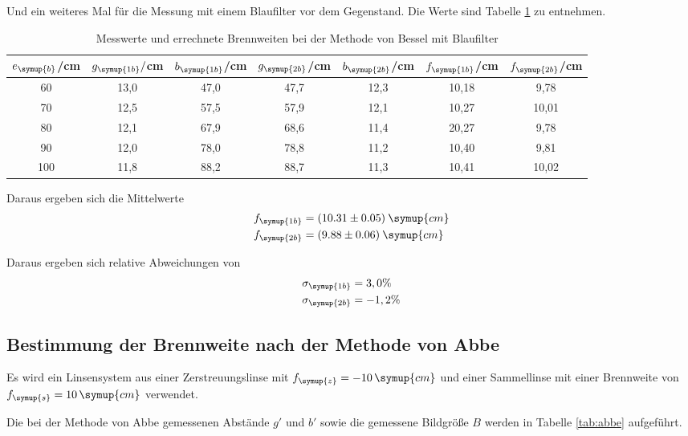 Und ein weiteres Mal für die Messung mit einem Blaufilter vor dem Gegenstand. Die Werte sind Tabelle
\ref{tab:besselblau} zu entnehmen.
\begin{table}[H]
  \centering
  \caption{Messwerte und errechnete Brennweiten bei der Methode von Bessel mit Blaufilter}
  \label{tab:besselblau}
  \begin{tabular}{c c c c c c c}
    \toprule
    $e_{\symup{b}}$/cm  & $g_{\symup{1b}}/$cm & $b_{\symup{1b}}$/cm & $g_{\symup{2b}}$/cm & $b_{\symup{2b}}$/cm & $f_{\symup{1b}}$/cm & $f_{\symup{2b}}$/cm \\
    \midrule
    60  &   13,0 &  47,0  &  47,7  &  12,3 & 10,18 & 9,78 \\
    70   &  12,5 &  57,5  &  57,9  &  12,1 & 10,27 & 10,01 \\
    80   &  12,1 &  67,9  &  68,6  &  11,4 & 20,27 & 9,78 \\
    90   &  12,0 &  78,0  &  78,8  &  11,2 & 10,40 & 9,81 \\
    100  &  11,8 &  88,2  &  88,7  &  11,3 & 10,41 & 10,02 \\
    \bottomrule
  \end{tabular}
\end{table}

Daraus ergeben sich die Mittelwerte
\begin{align*}
  &f_{\symup{1b}} = (10.31 \pm 0.05) \: \symup{cm} \\
  &f_{\symup{2b}} = (9.88 \pm 0.06) \: \symup{cm}
\end{align*}

Daraus ergeben sich relative Abweichungen von
\begin{align*}
  &\sigma_{\symup{1b}} = 3,0 \% \\
  &\sigma_{\symup{2b}} = -1,2 \%
\end{align*}

\subsection{Bestimmung der Brennweite nach der Methode von Abbe}
Es wird ein Linsensystem aus einer Zerstreuungslinse mit $f_{\symup{z}} = -10\,\symup{cm}$ und einer Sammellinse
mit einer Brennweite von $f_{\symup{s}} = 10\,\symup{cm}$ verwendet.

Die bei der Methode von Abbe gemessenen Abstände $g'$ und $b'$ sowie die gemessene Bildgröße $B$
werden in Tabelle \ref{tab:abbe} aufgeführt.

